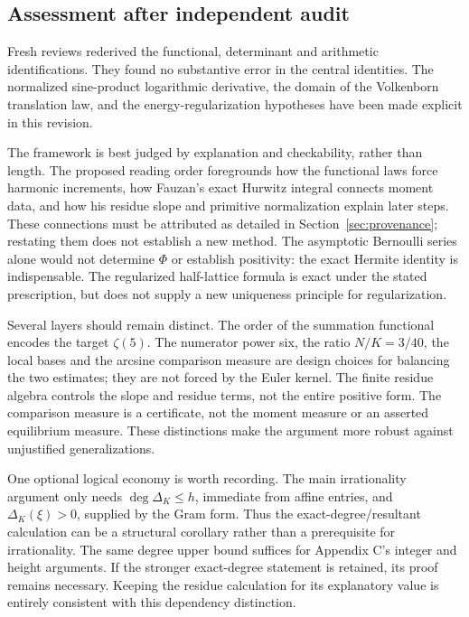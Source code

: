 \documentclass[11pt]{article}
\theoremstyle{definition}
\theoremstyle{remark}\newtheorem*{remark}{Remark}
\begin{document}
\subsection*{Assessment after independent audit}
Fresh reviews rederived the functional, determinant and arithmetic
identifications. They found no substantive error in the central identities.
The normalized sine-product logarithmic derivative, the domain of the
Volkenborn translation law, and the energy-regularization hypotheses have
been made explicit in this revision.

The framework is best judged by explanation and checkability, rather than
length. The proposed reading order foregrounds how the functional laws force
harmonic increments, how Fauzan's exact Hurwitz integral connects moment
data, and how his residue slope and primitive normalization explain later
steps. These connections must be attributed as detailed in
Section~\ref{sec:provenance}; restating them does not establish a new method.
The asymptotic Bernoulli
series alone would not determine $\Phi$ or establish positivity: the exact
Hermite identity is indispensable. The regularized half-lattice formula is
exact under the stated prescription, but does not supply a new uniqueness
principle for regularization.

Several layers should remain distinct. The order of the summation functional
encodes the target $\zeta(5)$. The numerator power six, the ratio $N/K=3/40$,
the local bases and the arcsine comparison measure are design choices for
balancing the two estimates; they are not forced by the Euler kernel.
The finite residue algebra controls the slope and residue terms, not the
entire positive form. The comparison measure is a certificate, not the
moment measure or an asserted equilibrium measure. These distinctions make
the argument more robust against unjustified generalizations.

One optional logical economy is worth recording. The main irrationality
argument only needs $\deg\Delta_K\le h$, immediate from affine entries, and
$\Delta_K(\xi)>0$, supplied by the Gram form. Thus the exact-degree/resultant
calculation can be a structural corollary rather than a prerequisite for
irrationality. The same degree upper bound suffices for Appendix C's integer
and height arguments. If the stronger exact-degree statement is retained,
its proof remains necessary. Keeping the residue calculation for its
explanatory value is entirely consistent with this dependency distinction.
\end{document}
